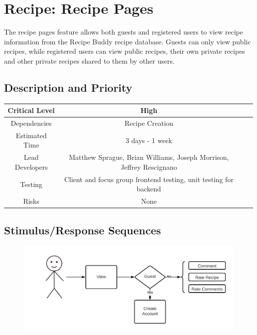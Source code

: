 \documentclass{scrreprt}
\begin{document}
\section{Recipe: Recipe Pages}

The recipe pages feature allows both guests and registered users to view recipe information from the Recipe Buddy recipe database. Guests can only view public recipes, while registered users can view public recipes, their own private recipes and other private recipes shared to them by other users.

\subsection{Description and Priority}
\begin{center}
    \begin{tabular}{| c | c | c | c |}
        \hline
        Critical Level  & High                                                                 \\
        \hline
        Dependencies    & Recipe Creation                                                      \\
        \hline
        Estimated Time  & 3 days - 1 week                                                      \\
        \hline
        Lead Developers & Matthew Sprague, Brian Williams, Joseph Morrison, Jeffrey Rescignano \\
        \hline
        Testing         & Client and focus group frontend testing, unit testing for backend    \\
        \hline
        Risks           & None                                                                 \\
        \hline
    \end{tabular}
\end{center}

\subsection{Stimulus/Response Sequences}

\begin{figure}[H]\centering
    \includegraphics[width=\columnwidth]{FlowCharts/Recipe-Pages.png}
\end{figure}
\end{document}
